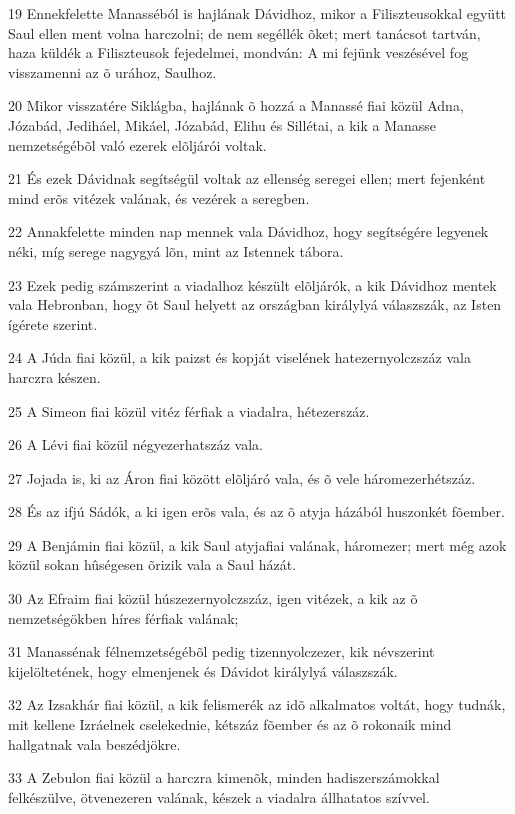 \par 19 Ennekfelette Manasséból is hajlának Dávidhoz, mikor a Filiszteusokkal együtt Saul ellen ment volna harczolni; de nem segéllék õket; mert tanácsot tartván, haza küldék a Filiszteusok fejedelmei, mondván: A mi fejünk veszésével fog visszamenni az õ urához, Saulhoz.
\par 20 Mikor visszatére Siklágba, hajlának õ hozzá a Manassé fiai közül Adna, Józabád, Jediháel, Mikáel, Józabád, Elihu és Sillétai, a kik a Manasse nemzetségébõl való ezerek elõljárói voltak.
\par 21 És ezek Dávidnak segítségül voltak az ellenség seregei ellen; mert fejenként mind erõs vitézek valának, és vezérek a seregben.
\par 22 Annakfelette minden nap mennek vala Dávidhoz, hogy segítségére legyenek néki, míg serege nagygyá lõn, mint az Istennek tábora.
\par 23 Ezek pedig számszerint a viadalhoz készült elõljárók, a kik Dávidhoz mentek vala Hebronban, hogy õt Saul helyett az országban királylyá válaszszák, az Isten ígérete szerint.
\par 24 A Júda fiai közül, a kik paizst és kopját viselének hatezernyolczszáz vala harczra készen.
\par 25 A Simeon fiai közül vitéz férfiak a viadalra, hétezerszáz.
\par 26 A Lévi fiai közül négyezerhatszáz vala.
\par 27 Jojada is, ki az Áron fiai között elõljáró vala, és õ vele háromezerhétszáz.
\par 28 És az ifjú Sádók, a ki igen erõs vala, és az õ atyja házából huszonkét fõember.
\par 29 A Benjámin fiai közül, a kik Saul atyjafiai valának, háromezer; mert még azok közül sokan hûségesen õrizik vala a Saul házát.
\par 30 Az Efraim fiai közül húszezernyolczszáz, igen vitézek, a kik az õ nemzetségökben híres férfiak valának;
\par 31 Manassénak félnemzetségébõl pedig tizennyolczezer, kik névszerint kijelöltetének, hogy elmenjenek és Dávidot királylyá válaszszák.
\par 32 Az Izsakhár fiai közül, a kik felismerék az idõ alkalmatos voltát, hogy tudnák, mit kellene Izráelnek cselekednie, kétszáz fõember és az õ rokonaik mind hallgatnak vala beszédjökre.
\par 33 A Zebulon fiai közül a harczra kimenõk, minden hadiszerszámokkal felkészülve, ötvenezeren valának, készek a viadalra állhatatos szívvel.
